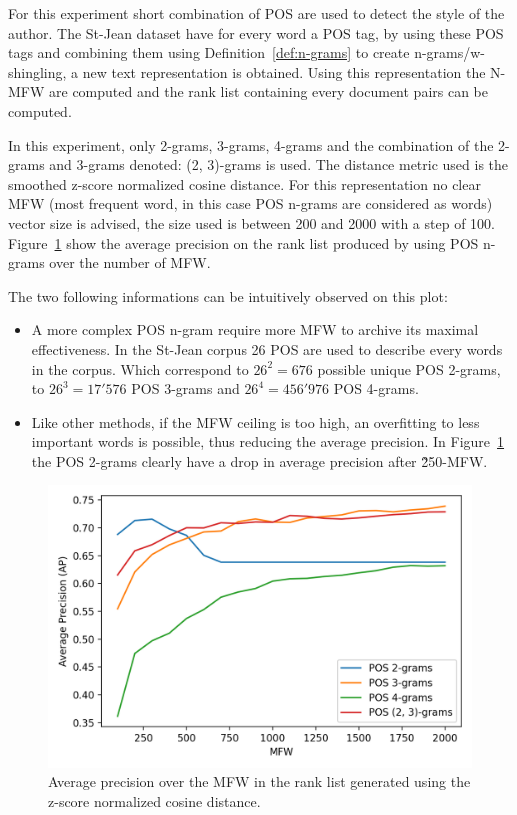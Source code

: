 For this experiment short combination of POS are used to detect the style of the author.
The St-Jean dataset have for every word a POS tag, by using these POS tags and combining them using Definition~\ref{def:n-grams} to create n-grams/w-shingling, a new text representation is obtained.
Using this representation the N-MFW are computed and the rank list containing every document pairs can be computed.

In this experiment, only 2-grams, 3-grams, 4-grams and the combination of the 2-grams and 3-grams denoted: (2, 3)-grams is used.
The distance metric used is the smoothed z-score normalized cosine distance.
For this representation no clear MFW (most frequent word, in this case POS n-grams are considered as words) vector size is advised, the size used is between 200 and 2000 with a step of 100.
Figure~\ref{fig:pos_ngrams} show the average precision on the rank list produced by using POS n-grams over the number of MFW.

The two following informations can be intuitively observed on this plot:
\begin{itemize}
  \item
  A more complex POS n-gram require more MFW to archive its maximal effectiveness.
  In the St-Jean corpus 26 POS are used to describe every words in the corpus.
  Which correspond to $26^2 = 676$ possible unique POS 2-grams, to $26^3 = 17'576$ POS 3-grams and $26^4 = 456'976$ POS 4-grams.
  \item
  Like other methods, if the MFW ceiling is too high, an overfitting to less important words is possible, thus reducing the average precision.
  In Figure~\ref{fig:pos_ngrams} the POS 2-grams clearly have a drop in average precision after \~250-MFW.
\end{itemize}

\begin{figure}
  \includegraphics[width=\linewidth]{img/pos_ngrams.png}
  \caption{Average precision over the MFW in the rank list generated using the z-score normalized cosine distance.}
  \label{fig:pos_ngrams}
\end{figure}

